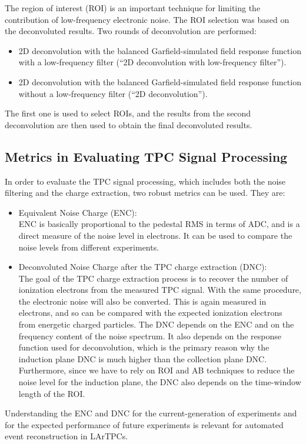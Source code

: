 The region of interest (ROI) is an important technique for limiting the contribution of low-frequency 
electronic noise. The ROI selection was based on the deconvoluted results. 
Two rounds of deconvolution are performed:
\begin{itemize}
\item 2D deconvolution with the balanced Garfield-simulated field response function with a low-frequency filter (``2D deconvolution with low-frequency filter'').
\item 2D deconvolution with the balanced Garfield-simulated field response function without a low-frequency filter (``2D deconvolution'').
\end{itemize}
The first one is used to select ROIs, and the results from the second deconvolution are then 
used to obtain the final deconvoluted results. 

\subsection{Metrics in Evaluating TPC Signal Processing}

In order to evaluate the TPC signal processing, which includes both the noise filtering and 
the charge extraction, two robust metrics can be used. %
They are:
\begin{itemize}
\item Equivalent Noise Charge (ENC): \\
  ENC is  basically proportional to the pedestal RMS in terms of ADC, and is a direct 
measure of the noise level in %
electrons. It can be used to compare the 
noise levels from different experiments.
\item Deconvoluted Noise Charge after the TPC charge extraction (DNC): \\
The goal of the TPC charge extraction process is to recover the number of ionization 
electrons from the measured TPC signal. With the same procedure, the electronic noise
will also be converted. %
This is again measured in electrons, %
and so can be compared with 
the expected ionization electrons from energetic charged particles. 
The DNC depends on the ENC and on the frequency content of the noise spectrum. It also depends 
on the response function used for deconvolution, which is the primary reason 
why the induction plane DNC is much higher than the collection plane DNC. Furthermore, since
we have to rely on ROI and AB techniques to reduce the noise level for the induction plane, the
DNC also depends on the time-window length of the ROI. 
\end{itemize}
Understanding the ENC and DNC for the current-generation of experiments and for the expected 
performance of future experiments is relevant for automated event reconstruction in LArTPCs.


